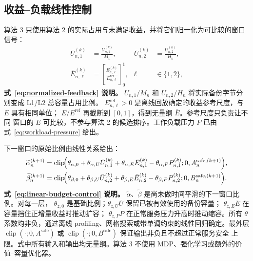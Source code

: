 \documentclass[UTF8,11pt,a4paper,fontset=fandol]{ctexart}
\newcommand{\clip}[1]{\left[#1\right]_0^1}
\begin{document}
\subsection{收益--负载线性控制}

算法 3 只使用算法 2 的实际占用与未满足收益，并将它们归一化为可比较的窗口信号：
\begin{equation}
  \begin{aligned}
    \bar U_{n,1}^{(k)}&=\frac{U_{n,1}^{(k)}}{M_n},
    &\bar U_{n,2}^{(k)}&=\frac{U_{n,2}^{(k)}}{H_n},\\
    \bar E_{n,\ell}^{(k)}
      &=\clip{\frac{E_{n,\ell}^{(k)}}{E_{n,\ell}^{\mathrm{ref}}}},
    &\ell&\in\{1,2\},
  \end{aligned}
  \label{eq:normalized-feedback}
\end{equation}
\noindent\textbf{式~\eqref{eq:normalized-feedback} 说明。}
$U_{n,1}/M_n$ 和 $U_{n,2}/H_n$ 将实际备份字节分别变成 L1/L2 总容量占用比例。
$E_{n,\ell}^{\mathrm{ref}}>0$ 是离线回放确定的收益参考尺度，与 $E$ 具有相同单位；
$E/E^{\mathrm{ref}}$ 再截断到 $[0,1]$，得到无量纲 $\bar E$。参考尺度只负责让不同
窗口的 $E$ 可比较，不参与算法 2 的候选排序。工作负载压力 $P$ 已由
式~\eqref{eq:workload-pressure} 给出。

下一窗口的原始比例由线性关系给出：
\begin{equation}
  \begin{aligned}
    \widetilde\alpha_n^{(k+1)}
      &=\operatorname{clip}\!\Bigl(
        \theta_{\alpha,0}
        +\theta_{\alpha,U}\bar U_{n,1}^{(k)}
        +\theta_{\alpha,E}\bar E_{n,1}^{(k)}
        -\theta_{\alpha,P}P_{n,1}^{(k)};
        0,A_n^{\mathrm{safe},(k+1)}
      \Bigr),\\
    \widetilde\beta_n^{(k+1)}
      &=\operatorname{clip}\!\Bigl(
        \theta_{\beta,0}
        +\theta_{\beta,U}\bar U_{n,2}^{(k)}
        +\theta_{\beta,E}\bar E_{n,2}^{(k)}
        -\theta_{\beta,P}P_{n,2}^{(k)};
        0,B_n^{\mathrm{safe},(k+1)}
      \Bigr).
  \end{aligned}
  \label{eq:linear-budget-control}
\end{equation}
\noindent\textbf{式~\eqref{eq:linear-budget-control} 说明。}
$\widetilde\alpha$、$\widetilde\beta$ 是尚未做时间平滑的下一窗口比例。对每一层，
$\theta_{z,0}$ 是基础比例；$\theta_{z,U}\bar U$ 保留已被有效使用的备份容量；
$\theta_{z,E}\bar E$ 在容量挡住正增量收益时推动扩容；
$\theta_{z,P}P$ 在正常服务压力升高时推动缩容。所有 $\theta$ 系数均非负，通过离线
profiling、网格搜索或带单调约束的线性回归确定。最外层
$\operatorname{clip}(\cdot;0,A^{\mathrm{safe}})$ 或
$\operatorname{clip}(\cdot;0,B^{\mathrm{safe}})$ 保证输出非负且不超过正常服务安全
上限。式中所有输入和输出均无量纲。算法 3
不使用 MDP、强化学习或额外的价值--容量优化器。
\end{document}
